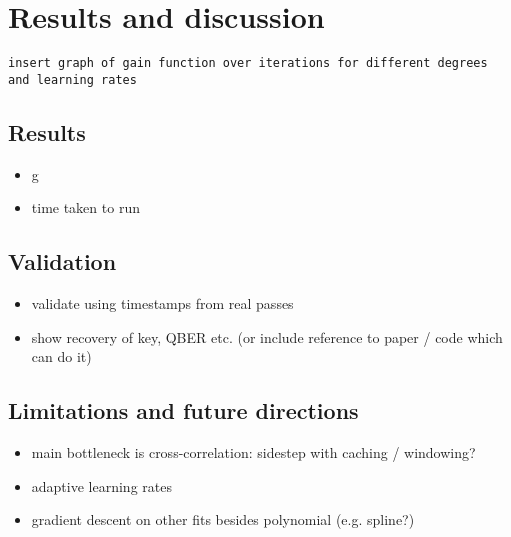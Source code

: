 \section{Results and discussion}

\noindent\texttt{insert graph of gain function over iterations for different degrees and learning rates}

\subsection{Results}
\begin{itemize}
	\item g
	\item time taken to run
\end{itemize}

\subsection{Validation}
\begin{itemize}
	\item validate using timestamps from real passes
	\item show recovery of key, QBER etc. (or include reference to paper / code which can do it)
\end{itemize}

\subsection{Limitations and future directions}
\begin{itemize}
	\item main bottleneck is cross-correlation: sidestep with caching / windowing?
	\item adaptive learning rates
	\item gradient descent on other fits besides polynomial (e.g. spline?)
\end{itemize}
